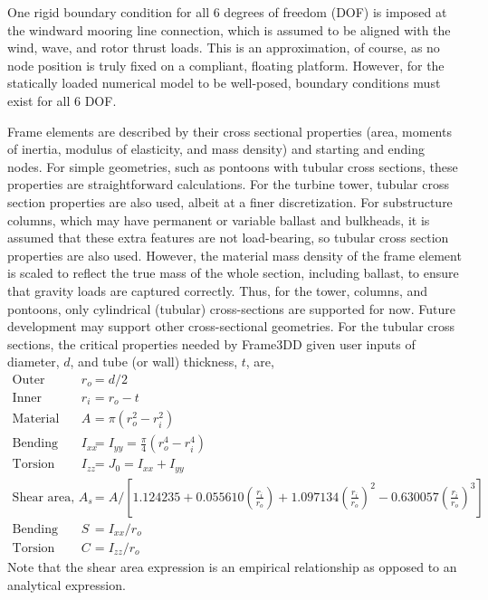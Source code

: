 One rigid boundary condition for all 6 degrees of freedom (DOF) is
imposed at the windward mooring line connection, which is assumed to be
aligned with the wind, wave, and rotor thrust loads.  This is an
approximation, of course, as no node position is truly fixed on a
compliant, floating platform.  However, for the statically loaded
numerical model to be well-posed, boundary conditions must exist for all
6 DOF.

Frame elements are described by their cross sectional properties (area,
moments of inertia, modulus of elasticity, and mass density) and
starting and ending nodes.  For simple geometries, such as pontoons with
tubular cross sections, these properties are straightforward
calculations.  For the turbine tower, tubular cross section properties
are also used, albeit at a finer discretization.  For substructure
columns, which may have permanent or variable ballast and bulkheads,
it is assumed that these extra features are not load-bearing, so
tubular cross section properties are also used.  However, the material mass
density of the frame element is scaled to reflect the true mass of the
whole section, including ballast, to ensure that gravity loads are
captured correctly.  Thus, for the tower,
columns, and pontoons, only cylindrical (tubular) cross-sections are
supported for now.  Future development may support other cross-sectional
geometries.  For the tubular cross sections, the critical properties needed by
Frame3DD given user inputs of diameter, $d$, and tube (or wall)
thickness, $t$, are,
\begin{align*}
  \textrm{Outer radius, } r_o &= d/2\\
  \textrm{Inner radius, } r_i &= r_o - t\\
  \textrm{Material area, } A &= \pi \left( r_o^2 - r_i^2 \right)\\
  \textrm{Bending second moment of area, } I_{xx} &= I_{yy} = \frac{\pi}{4}\left( r_o^4 - r_i^4 \right)\\
  \textrm{Torsion second moment of area, } I_{zz} &= J_0 = I_{xx} + I_{yy}\\
  \textrm{Shear area, } A_{s} &= A / \left[ 1.124235 + 0.055610\left(\frac{r_i}{r_o}\right) +
           1.097134\left(\frac{r_i}{r_o}\right)^2 - 0.630057\left(\frac{r_i}{r_o}\right)^3 \right]\\
  \textrm{Bending modulus, } S &= I_{xx} / r_o \\
  \textrm{Torsion modulus (shear constant), } C &= I_{zz} / r_o
\end{align*}
Note that the shear area expression is an empirical relationship as
opposed to an analytical expression.

